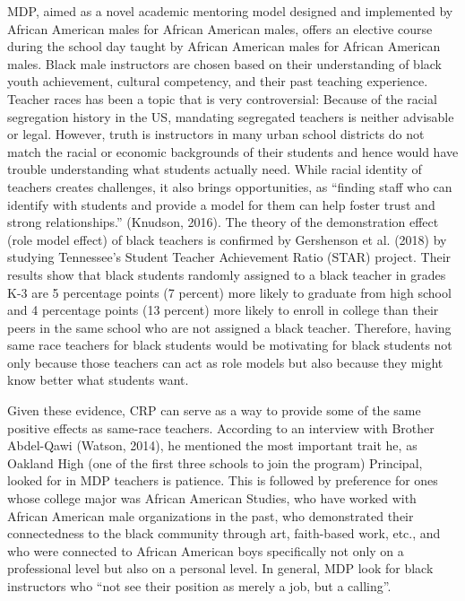 MDP, aimed as a novel academic mentoring model designed and implemented by African American males for African American males, offers an elective course during the school day taught by African American males for African American males. Black male instructors are chosen based on their understanding of black youth achievement, cultural competency, and their past teaching experience. Teacher races has been a topic that is very controversial: Because of the racial segregation history in the US, mandating segregated teachers is neither advisable or legal. However, truth is instructors in many urban school districts do not match the racial or economic backgrounds of their students and hence would have trouble understanding what students actually need. While racial identity of teachers creates challenges, it also brings opportunities, as “finding staff who can identify with students and provide a model for them can help foster trust and strong relationships.” (Knudson, 2016). The theory of the demonstration effect (role model effect) of black teachers is confirmed by Gershenson et al. (2018) by studying Tennessee's Student Teacher Achievement Ratio (STAR) project. Their results show that black students randomly assigned to a black teacher in grades K-3 are 5 percentage points (7 percent) more likely to graduate from high school and 4 percentage points (13 percent) more likely to enroll in college than their peers in the same school who are not assigned a black teacher. Therefore, having same race teachers for black students would be motivating for black students not only because those teachers can act as role models but also because they might know better what students want. 

Given these evidence, CRP can serve as a way to provide some of the same positive effects as same-race teachers. According to an interview with Brother Abdel-Qawi (Watson, 2014), he mentioned the most important trait he, as Oakland High (one of the first three schools to join the program) Principal, looked for in MDP teachers is patience. This is followed by preference for ones whose college major was African American Studies, who have worked with African American male organizations in the past, who demonstrated their connectedness to the black community through art, faith-based work, etc., and who were connected to African American boys specifically not only on a professional level but also on a personal level. In general, MDP look for black instructors who “not see their position as merely a job, but a calling”. 

